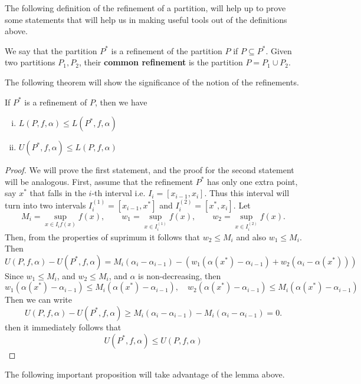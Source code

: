 The following definition of the refinement of a partition, will help up to prove some statements that will help us in making useful tools out of the definitions above.
\begin{definition}
	We say that the partition $P^*$ is a refinement of the partition $P$ if $P \subseteq P^*$. Given two partitions $P_1, P_2$, their \textbf{common refinement} is the partition $P = P_1 \cup P_2$.
\end{definition}
The following theorem will show the significance of the notion of the refinements.
\begin{lemma}
	If $P^*$ is a refinement of $P$, then we have
	\begin{enumerate}[(i)]
		\item $L(P,f,\alpha) \leq L(P^*,f,\alpha)$
		\item $U(P^*,f,\alpha) \leq L(P, f, \alpha)$
	\end{enumerate}
\end{lemma}
\begin{proof}
	We will prove the first statement, and the proof for the second statement will be analogous. First, assume that the refinement $P^*$ has only one extra point, say $x^*$ that falls in the $i$-th interval i.e. $I_i = [x_{i-1}, x_i]$. Thus this interval will turn into two intervals $I_i^{(1)} = [ x_{i-1}, x^* ]$ and $I_i^{(2)} = [x^*, x_i]$. Let 
	\[ M_i = \sup_{x\in I_i f(x)}f(x),\qquad w_1 = \sup_{x\in I_i^{(1)}}f(x),\qquad w_2 = \sup_{x\in I_i^{(2)}}f(x). \]
	Then, from the properties of suprimum it follows that $w_2 \leq M_i$ and also $w_1 \leq M_i$. Then 
	\[ U(P,f,\alpha) - U(P^*,f,\alpha) = M_i(\alpha_{i} - \alpha_{i-1}) - \left( w_1(\alpha(x^*) - \alpha_{i-1}) + w_2(\alpha_i - \alpha(x^*)) \right) \]
	Since $w_1 \leq M_i$, and $w_2 \leq M_i$, and $\alpha$ is non-decreasing, then
	\[ w_1 (\alpha(x^*) - \alpha_{i-1}) \leq M_i(\alpha(x^*) - \alpha_{i-1}),\quad w_2 (\alpha(x^*) - \alpha_{i-1}) \leq M_i(\alpha(x^*) - \alpha_{i-1}) \]
	Then we can write
	\[ U(P,f,\alpha) - U(P^*,f,\alpha) \geq M_i(\alpha_i - \alpha_{i-1}) - M_i(\alpha_i - \alpha_{i-1}) = 0. \]
	then it immediately follows that
	\[ U(P^*,f,\alpha) \leq U(P,f,\alpha) \]
\end{proof}

The following important proposition will take advantage of the lemma above.

